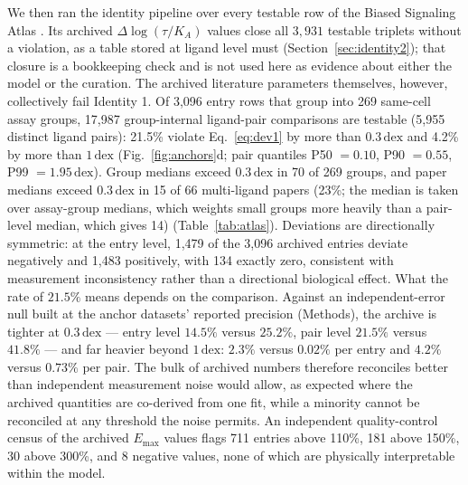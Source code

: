 ﻿\documentclass[11pt,a4paper]{article}
\newcommand{\dex}{\ensuremath{\,\mathrm{dex}}}
\newcommand{\logR}{\ensuremath{\log(\tau/K_{\!A})}}
\newcommand{\Emax}{\ensuremath{E_{\max}}}
\begin{document}
We then ran the identity pipeline over every testable row of the Biased Signaling Atlas \cite{BSA}. Its archived $\Delta\logR$ values close all $3{,}931$ testable triplets without a violation, as a table stored at ligand level must (Section~\ref{sec:identity2}); that closure is a bookkeeping check and is not used here as evidence about either the model or the curation. The archived literature parameters themselves, however, collectively fail Identity 1. Of 3{,}096 entry rows that group into 269 same-cell assay groups, 17{,}987 group-internal ligand-pair comparisons are testable (5{,}955 distinct ligand pairs): 21.5\% violate Eq.~\eqref{eq:dev1} by more than $0.3\dex$ and 4.2\% by more than $1\dex$ (Fig.~\ref{fig:anchors}d; pair quantiles P50 $=0.10$, P90 $=0.55$, P99 $=1.95\dex$). Group medians exceed $0.3\dex$ in 70 of 269 groups, and paper medians exceed $0.3\dex$ in 15 of 66 multi-ligand papers (23\%; the median is taken over assay-group medians, which weights small groups more heavily than a pair-level median, which gives 14) (Table~\ref{tab:atlas}). Deviations are directionally symmetric: at the entry level, 1{,}479 of the 3{,}096 archived entries deviate negatively and 1{,}483 positively, with 134 exactly zero, consistent with measurement inconsistency rather than a directional biological effect. What the rate of $21.5\%$ means depends on the comparison. Against an independent-error null built at the anchor datasets' reported precision (Methods), the archive is tighter at $0.3\dex$ — entry level $14.5\%$ versus $25.2\%$, pair level $21.5\%$ versus $41.8\%$ — and far heavier beyond $1\dex$: $2.3\%$ versus $0.02\%$ per entry and $4.2\%$ versus $0.73\%$ per pair. The bulk of archived numbers therefore reconciles better than independent measurement noise would allow, as expected where the archived quantities are co-derived from one fit, while a minority cannot be reconciled at any threshold the noise permits. An independent quality-control census of the archived $\Emax$ values flags 711 entries above 110\%, 181 above 150\%, 30 above 300\%, and 8 negative values, none of which are physically interpretable within the model.
\end{document}
